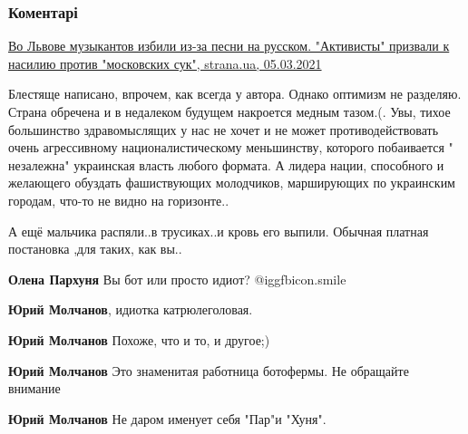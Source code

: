 
 
 
 
 
\subsubsection{Коментарі}

\begin{itemize} %

\href{https://lvov.strana.news/321171-zakon-o-jazyke-dobralsja-do-muzykantov-vo-lvove-izbili-ljudej-za-russkij-jazyk.html}{%
Во Львове музыкантов избили из-за песни на русском. "Активисты" призвали к насилию против "московских сук", %
strana.ua, 05.03.2021%
}


Блестяще написано, впрочем, как всегда у автора. Однако оптимизм не разделяю.
Страна обречена и в недалеком будущем накроется медным тазом.(. Увы, тихое
большинство здравомыслящих у нас не хочет и не может противодействовать очень
агрессивному националистическому меньшинству, которого побаивается " незалежна"
украинская власть любого формата. А лидера нации, способного и желающего
обуздать фашиствующих молодчиков, марширующих по украинским городам, что-то не
видно на горизонте..



А ещё мальчика распяли..в трусиках..и кровь его выпили.  Обычная платная
постановка ,для таких, как вы..

\begin{itemize} %
\textbf{Олена Пархуня} Вы бот или просто идиот?  @igg{fbicon.smile} 

\textbf{Юрий Молчанов}, идиотка катрюлеголовая.

\textbf{Юрий Молчанов} Похоже, что и то, и другое;)

\textbf{Юрий Молчанов} Это знаменитая работница ботофермы. Не обращайте внимание

\textbf{Юрий Молчанов} Не даром именует себя "Пар"и "Хуня".


\end{itemize}
\end{itemize}
